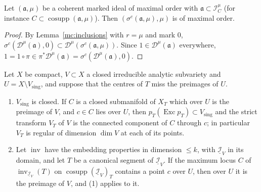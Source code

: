 \begin{lemma}
\label{mc:maximal-order-transform}
\mixedleanok
Let \((\mathfrak a,\mu)\) be a coherent marked ideal of maximal order with \(\mathfrak a\subset\mathcal I_C^\mu\) (for instance
\(C\subset\operatorname{cosupp}(\mathfrak a,\mu)\)). Then \((\sigma^c(\mathfrak a,\mu),\mu)\) is of maximal order.
\end{lemma}
\begin{proof}
\mixedleanok
By Lemma~\ref{mc:inclusions} with \(r=\mu\) and mark \(0\), \(\sigma^c(\mathcal D^\mu(\mathfrak a),0)\subset\mathcal D^\mu(\sigma^c(\mathfrak a,\mu))\). Since
\(1\in\mathcal D^\mu(\mathfrak a)\) everywhere, \(1=1\circ\pi\in\pi^*\mathcal D^\mu(\mathfrak a)=\sigma^c(\mathcal D^\mu(\mathfrak a),0)\).
\end{proof}
\begin{lemma}
\label{mc:first-centre-smooth-part}
\mixedleanok
Let \(X\) be compact, \(V\subset X\) a closed irreducible analytic subvariety and \(U=X\setminus V_{\mathrm{sing}}\), and suppose that the centres of \(T\) miss the
preimages of \(U\).
\begin{enumerate}
\item \(V_{\mathrm{sing}}\) is closed. If \(C\) is a closed submanifold of \(X_T\) which over \(U\) is the preimage of \(V\), and \(c\in C\) lies over \(U\), then
\(p_T(\operatorname{Exc}p_T)\subset V_{\mathrm{sing}}\) and the strict transform \(V_T\) of \(V\) is the connected component of \(C\) through \(c\); in particular
\(V_T\) is regular of dimension \(\dim V\) at each of its points.
\item Let \(\operatorname{inv}\) have the embedding properties in dimension \(\le k\), with \(\underline{\mathcal I}_V\) in its domain, and let \(T\) be a canonical
segment of \(\underline{\mathcal I}_V\). If the maximum locus \(C\) of \(\operatorname{inv}_{\underline{\mathcal I}_V}(T)\) on \(\operatorname{cosupp}(\underline{\mathcal I}_V)_T\)
contains a point \(c\) over \(U\), then over \(U\) it is the preimage of \(V\), and (1) applies to it.
\end{enumerate}
\end{lemma}
